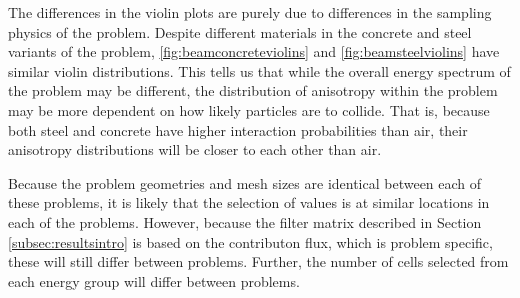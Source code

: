 The differences in the violin plots are purely due to differences in the
sampling physics of the problem. Despite different materials in the concrete and
steel variants of the problem,
\ref{fig:beamconcreteviolins} and \ref{fig:beamsteelviolins} have similar violin
distributions. This tells us that while the overall energy spectrum of the
problem may be different, the distribution of anisotropy within the problem may
be more dependent on how likely particles are to collide. That is, because both
steel and concrete have higher interaction probabilities than air, their
anisotropy distributions will be closer to each other than air.

Because the problem geometries and mesh sizes are identical between each of
these problems, it is likely that the selection of values is at similar
locations in each of the problems. However, because the filter matrix described
in Section \ref{subsec:resultsintro} is based on the contributon flux, which is
problem specific, these will still differ between problems. Further, the number
of cells selected from each energy group will differ between problems.


